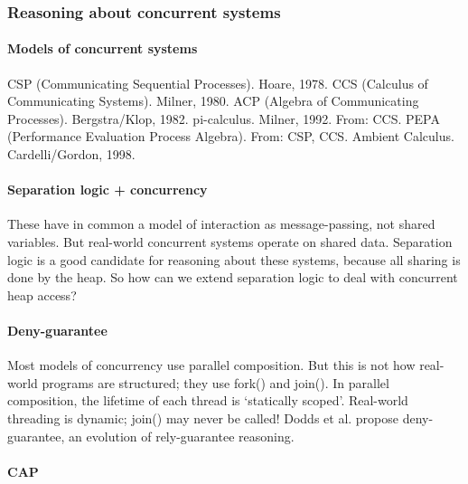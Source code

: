 \subsubsection{Reasoning about concurrent systems}

\paragraph{Models of concurrent systems}

CSP (Communicating Sequential Processes).  Hoare, 1978.
CCS (Calculus of Communicating Systems).  Milner, 1980.
ACP (Algebra of Communicating Processes).  Bergstra/Klop, 1982.
pi-calculus.  Milner, 1992.  From: CCS.
PEPA (Performance Evaluation Process Algebra).  From: CSP, CCS.
Ambient Calculus.  Cardelli/Gordon, 1998.


\paragraph{Separation logic + concurrency}

These have in common a model of interaction as message-passing, not shared variables.
But real-world concurrent systems operate on shared data.
Separation logic is a good candidate for reasoning about these systems, because all sharing is done by the heap.
So how can we extend separation logic to deal with concurrent heap access?


\paragraph{Deny-guarantee}

Most models of concurrency use parallel composition.
But this is not how real-world programs are structured; they use fork() and join().
In parallel composition, the lifetime of each thread is ‘statically scoped’.
Real-world threading is dynamic; join() may never be called!
Dodds et al. propose deny-guarantee, an evolution of rely-guarantee reasoning.


\paragraph{CAP}

